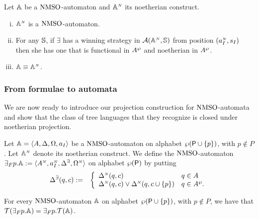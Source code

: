 
\begin{proposition}\label{PROP_facts_finConstr} Let $\mathbb{A}$ be a $\mathrm{NMSO}$-automaton and $\mathbb{A}^{{\scriptscriptstyle N}}$ its noetherian construct.
\begin{enumerate}[(i)]
   pt
  \item $\mathbb{A}^{{\scriptscriptstyle N}}$ is a $\mathrm{NMSO}$-automaton.\label{point:finConstrAut}
  \item For any $\mathbb{S}$, if $\exists$ has a winning strategy in $\mathcal{A}(\mathbb{A}^{{\scriptscriptstyle N}},\mathbb{S})$ from position $(a_I^{{\scriptscriptstyle N}},s_I)$ then she has one that is functional in $A^{\wp}$ and noetherian in $A^{\wp}$.%
  \label{point:finConstrStrategy}
  \item $\mathbb{A} \equiv \mathbb{A}^{{\scriptscriptstyle N}}$. \label{point:finConstrEquiv}
  \end{enumerate}
\end{proposition}

\subsubsection{From formulae to automata}

We are now ready to introduce our projection construction for $\mathrm{NMSO}$-automata and show that the class of tree languages that they recognize is closed under noetherian
projection.
\begin{definition}\label{DEF_fin_projection}
Let $\mathbb{A} = \langle{A,\Delta,\Omega,a_I}\rangle$ be a $\mathrm{NMSO}$-automaton on alphabet $\wp(\mathsf{P} \cup \{p\})$, with $p \not\in P$. Let $\mathbb{A}^{{\scriptscriptstyle N}}$
denote its noetherian construct.
We define the $\mathrm{NMSO}$-automaton ${{\exists}_F p}.\mathbb{A} := \langle A^{{\scriptscriptstyle N}}, a_I^{{\scriptscriptstyle N}},
\Delta^\exists, \Omega^{{\scriptscriptstyle N}}\rangle$ on alphabet $\wp(\mathsf{P})$ by putting
\begin{eqnarray*}
\Delta^\exists(q,c) &:=& \left\{
	\begin{array}{ll}
        \Delta^{{\scriptscriptstyle N}}(q,c) & q\in A \\
		\Delta^{{\scriptscriptstyle N}}(q,c) \vee \Delta^{{\scriptscriptstyle N}}(q,c\cup\{p\}) & q \in A^{\wp}.
	\end{array}
\right.
\end{eqnarray*}
\end{definition}
\begin{proposition}\label{PROP_fin_projection}
For every $\mathrm{NMSO}$-automaton $\mathbb{A}$ on alphabet ${\wp (\mathsf{P} \cup \{p\})}$, with $p \not\in P$, we have that $\mathcal{T}({{\exists}_F p}.\mathbb{A}) = {{\exists}_F p}.\mathcal{T}(\mathbb{A})$.
\end{proposition}

